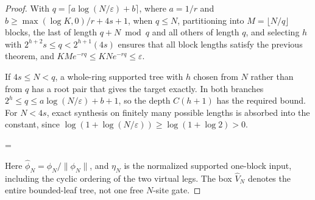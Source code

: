 \begin{proof}
    \leanok
    With $q=\lceil a\log(N/\varepsilon)+b\rceil$, where $a=1/r$ and
    $b\ge\max(\log K,0)/r+4s+1$, when $q\le N$, partitioning into $M=\lfloor N/q\rfloor$
    blocks, the last of length $q+N\bmod q$ and all others of length $q$, and
    selecting $h$ with $2^{h+2}s\le q<2^{h+1}(4s)$ ensures that all block lengths satisfy
    the previous theorem, and $KM e^{-rq}\le KN e^{-rq}\le\varepsilon$.

    If $4s\le N<q$, a whole-ring supported tree with $h$ chosen from
    $N$ rather than from $q$ has a root pair that gives the target exactly.
    In both branches $2^h\le q\le a\log(N/\varepsilon)+b+1$, so the
    depth $C(h+1)$ has the required bound. For $N<4s$, exact synthesis
    on finitely many possible lengths is absorbed into the constant,
    since $\log(1+\log(N/\varepsilon))\ge\log(1+\log2)>0$.

    \begin{center}
        \tenkzkernel
        \begin{tenkzequation}
            \begin{tenkz}[rows={wire}, cols=1, bonds=none]
            \end{tenkz}
            =
            \begin{tenkz}[rows={wire,wire}, cols=1, bonds=none]
            \end{tenkz}
        \end{tenkzequation}
    \end{center}
    Here $\widehat\phi_N=\phi_N/\|\phi_N\|$, and $\eta_N$ is the
    normalized supported one-block input, including
    the cyclic ordering of the two virtual legs. The box $\widehat V_N$
    denotes the entire bounded-leaf tree, not one free $N$-site gate.
\end{proof}

